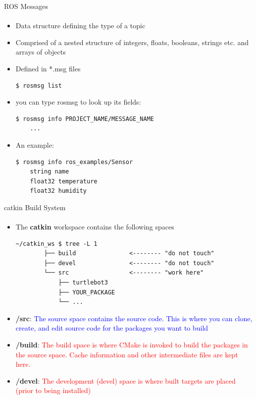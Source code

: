 \documentclass[aspectratio=169]{beamer}
\begin{document}
\begin{frame}[fragile]{ROS Messages}
	\framesubtitle{ }
	\begin{minipage}{0.6\textwidth}
    \begin{itemize}
        \item Data structure defining the type of a topic
		\item Comprised of a nested structure of integers, floats, booleans, strings etc. and arrays of objects
		\item Defined in *.msg files
		\begin{lstlisting}[language=bash]
	$ rosmsg list
		\end{lstlisting}
		\item you can type rosmsg to look up its fields:
		\begin{lstlisting}[language=bash]
	$ rosmsg info PROJECT_NAME/MESSAGE_NAME
	...
		\end{lstlisting}

		\item An example:
		\begin{lstlisting}[language=bash]
	$ rosmsg info ros_examples/Sensor 
	string name
	float32 temperature
	float32 humidity	
		\end{lstlisting}

    \end{itemize}

\end{minipage}
\begin{minipage}{0.4\textwidth}
	
\end{minipage}
\end{frame}


\begin{frame}[fragile]{catkin Build System}
	\framesubtitle{ }
    \begin{itemize}
        \item The \textbf{catkin} workspace contains the following spaces

		\begin{lstlisting}[style=ascii-tree]
		~/catkin_ws $ tree -L 1
		├── build				<-------- "do not touch"
		├── devel				<-------- "do not touch"
		└── src					<-------- "work here"
			├── turtlebot3
			├── YOUR_PACKAGE
			└── ...
		\end{lstlisting}

		\item \textbf{/src}: \textcolor{blue}{The source space contains the source code. This is where you can clone, create, and edit source code for the packages you want to build}
		\item \textbf{/build}: \textcolor{red}{The build space is where CMake is invoked to build the packages in the source space. Cache information and other intermediate files are kept here.}
		\item \textbf{/devel}: \textcolor{red}{The development (devel) space is where built targets are placed (prior to being installed)}
		\end{itemize}
\end{frame}
\end{document}
